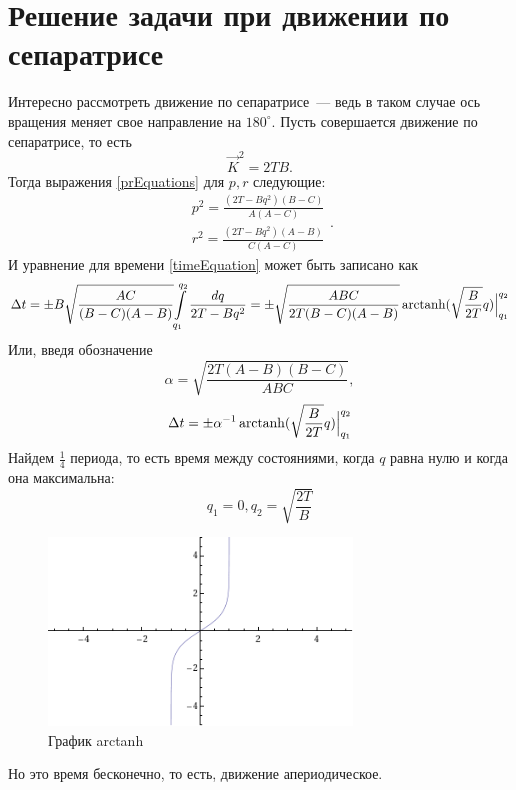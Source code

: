 \documentclass{article}
\DeclareMathOperator\arctanh{arctanh}
\newcommand{\degree}{^{\circ}}
\begin{document}
\section{Решение задачи при движении по сепаратрисе}
Интересно рассмотреть движение по сепаратрисе~--- ведь в таком случае ось вращения меняет свое направление на \begin{math}180\degree\end{math}.
Пусть совершается движение по сепаратрисе, то есть
\begin{equation}
\vec{K}^2=2TB.
\end{equation}
Тогда выражения \ref{prEquations} для \begin{math} p, r \end{math} следующие:
\begin{equation}
\begin{array}{l}
p^2=\frac{(2T-Bq^2)(B-C)}{A(A-C)}\\
r^2=\frac{(2T-Bq^2)(A-B)}{C(A-C)}
\end{array}.
\end{equation}
И уравнение для времени \ref{timeEquation} может быть записано как
\begin{equation}
\Delta t=\pm B\sqrt{\frac{AC}{(B-C)(A-B)}}{\int\limits_{q_1}^{q_2}\frac{dq}{2T-Bq^2}}=
\pm\sqrt{\frac{ABC}{2T(B-C)(A-B)}}\arctanh(\sqrt{\frac{B}{2T}}q)\Bigl|_{q_1}^{q_2}
\end{equation}
Или, введя обозначение
\begin{equation}
\label{alphaEquation}
\alpha=\sqrt{\frac{2T(A-B)(B-C)}{ABC}},
\end{equation}
\begin{equation}
\Delta t=\pm\alpha^{-1}\arctanh(\sqrt{\frac{B}{2T}}q)\Bigl|_{q_1}^{q_2}
\end{equation}
Найдем \begin{math} \frac{1}{4} \end{math} периода, то есть время между состояниями, когда \begin{math} q \end{math} равна нулю и когда она максимальна:
\begin{equation}
q_1=0, q_2=\sqrt{\frac{2T}{B}}
\end{equation}
\begin{figure}[h]
\includegraphics[height=5cm]{ArcTanh}
\caption{График arctanh}
\end{figure}
Но это время бесконечно, то есть, движение апериодическое.
\end{document}
